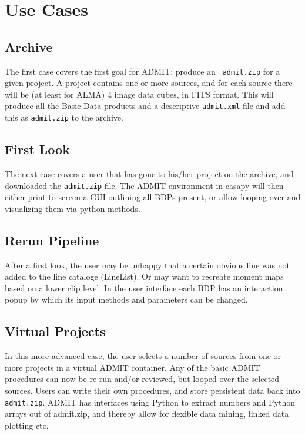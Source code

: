 \documentclass{report}
\begin{document}
\section{Use Cases}

\subsection{Archive}

The first case covers the first goal for ADMIT: produce an {\tt
  admit.zip} for a given project.  A project contains one or more
sources, and for each source there will be (at least for ALMA) 4 image
data cubes, in FITS format. This will produce all the Basic Data
products and a descriptive {\tt admit.xml} file and add this as 
{\tt admit.zip} to the archive.



\subsection{First Look}

The next case covers a user that has gone to his/her project on the archive,
and downloaded the {\tt admit.zip} file. The ADMIT environment in casapy
will then either print to screen a GUI outlining all BDPs present, or
allow looping over and visualizing them via python methods.

\subsection{Rerun Pipeline}

After a first look, the user may be unhappy that a certain obvious line
was not added to the line cataloge (LineList). Or may want to recreate
moment maps based on a lower clip level. In the user interface each BDP has an
interaction popup by which its input methods and parameters can be changed.

\subsection{Virtual Projects}

In this more advanced case, the user selects a number of sources from one
or more projects in a virtual ADMIT container. Any of the basic ADMIT procedures
can now be re-run and/or reviewed, but looped over the selected sources.
Users can write their own procedures,
and store persistent data back into {\tt admit.zip}. ADMIT has interfaces
using Python to extract numbers and Python arrays out of admit.zip, and thereby
allow for flexible data mining, linked data plotting etc.
\end{document}
